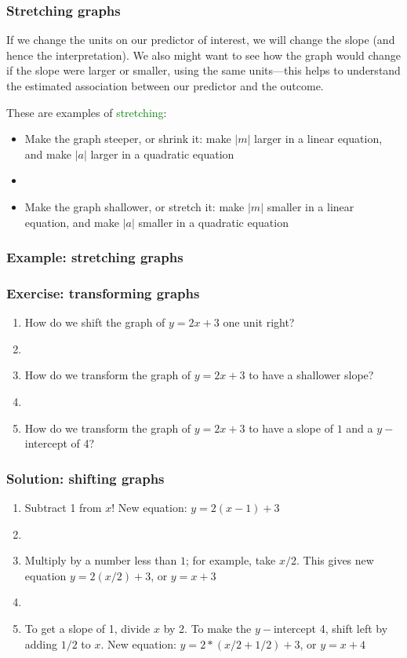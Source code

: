\documentclass[11pt]{beamer}
\newcommand{\myframe}[1]{\begin{frame} \frametitle{#1}}
\begin{document}
\myframe{Stretching graphs}
If we change the units on our predictor of interest, we will change the slope (and hence the interpretation). We also might want to see how the graph would change if the slope were larger or smaller, using the same units---this helps to understand the estimated association between our predictor and the outcome.

These are examples of \textcolor{green}{stretching}:
\begin{itemize}
\item Make the graph steeper, or shrink it: make $|m|$ larger in a linear equation, and make $|a|$ larger in a quadratic equation
\item[]
\item Make the graph shallower, or stretch it: make $|m|$ smaller in a linear equation, and make $|a|$ smaller in a quadratic equation
\end{itemize}
\end{frame}

\myframe{Example: stretching graphs}
\centering
{}
\end{frame}

\myframe{Exercise: transforming graphs}
\begin{enumerate}
\item How do we shift the graph of $y = 2x + 3$ one unit right?
\item[]
\item How do we transform the graph of $y = 2x + 3$ to have a shallower slope?
\item[]
\item How do we transform the graph of $y = 2x + 3$ to have a slope of $1$ and a $y-$intercept of 4?
\end{enumerate}
\end{frame}

\myframe{Solution: shifting graphs}
\begin{enumerate}
\item Subtract 1 from $x$! New equation: $y = 2(x-1) + 3$
\item[]
\item Multiply by a number less than $1$; for example, take $x/2$. This gives new equation $y = 2(x/2) + 3$, or $y = x + 3$
\item[]
\item To get a slope of 1, divide $x$ by 2. To make the $y-$intercept 4, shift left by adding $1/2$ to $x$. New equation: $y = 2*(x/2 + 1/2) + 3$, or $y = x + 4$
\end{enumerate}
\end{frame}
\end{document}
